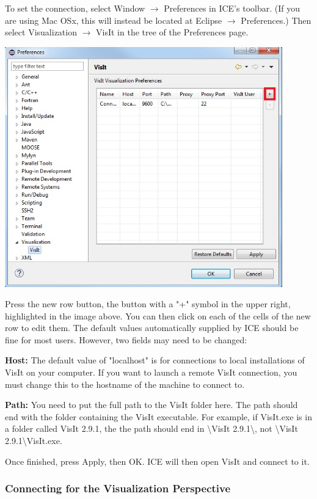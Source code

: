 \documentclass{article}
\begin{document}
To set the connection, select Window $\rightarrow$ Preferences in ICE's
toolbar. (If you are using Mac OSx, this will instead be located at Eclipse
$\rightarrow$ Preferences.) Then select Visualization $\rightarrow$ VisIt in the
tree of the Preferences page.

\begin{center}
\includegraphics[width=12cm]{images/VisItPreferencePage_ICE}
\end{center}

Press the new row button, the button with a "+" symbol in the upper right,
highlighted in the image above. You can then click on each of the cells of the
new row to edit them. The default values automatically supplied by ICE should
be fine for most users. However, two fields may need to be changed:

\textbf{Host:} The default value of "localhost" is for connections to local
installations of VisIt on your computer. If you want to launch a remote VisIt
connection, you must change this to the hostname of the machine to connect to.

\textbf{Path:} You need to put the full path to the VisIt folder here. The path
should end with the folder containing the VisIt executable. For example, if
VisIt.exe is in a folder called VisIt 2.9.1, the the path should end in
\textbackslash{}VisIt 2.9.1\textbackslash , not \textbackslash{}VisIt
2.9.1\textbackslash VisIt.exe.

Once finished, press Apply, then OK. ICE will then open VisIt and connect to it.

\subsubsection{Connecting for the Visualization Perspective} 
\end{document}
